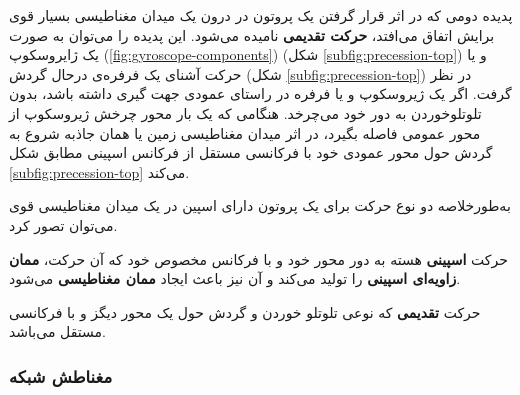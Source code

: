  
پدیده دومی که در اثر قرار گرفتن یک پروتون در درون یک میدان مغناطیسی بسیار قوی برایش اتفاق می‌افتد، \textbf{حرکت تقدیمی }نامیده می‌شود. این پدیده را می‌توان به صورت یک ژایروسکوپ 
(\ref{fig:gyroscope-components})
(شکل \ref{subfig:precession-top}) و یا حرکت آشنای یک فرفره‌ی درحال گردش (شکل \ref{subfig:precession-top})
در نظر گرفت. اگر یک ژیروسکوپ و یا فرفره در راستای عمودی جهت گیری داشته باشد، بدون تلوتلو‌خوردن
به دور خود می‌چرخد. هنگامی که یک بار محور چرخش ژیروسکوپ از محور عمومی فاصله بگیرد، در اثر میدان مغناطیسی زمین یا همان جاذبه
 شروع به گردش حول محور عمودی خود با فرکانسی مستقل از فرکانس اسپینی مطابق شکل \ref{subfig:precession-top}
می‌کند. 

به‌طور‌خلاصه دو نوع حرکت برای یک پروتون دارای اسپین در یک میدان مغناطیسی قوی می‌توان تصور کرد.

\begin{alphabetlist}
	\item
	حرکت \textbf{اسپینی} هسته به دور محور خود و با فرکانس مخصوص خود که آن حرکت، \textbf{ممان زاویه‌ای اسپینی }را تولید می‌کند و آن نیز باعث ایجاد \textbf{ممان مغناطیسی }می‌شود.
	\item
	حرکت \textbf{تقدیمی} که نوعی تلوتلو خوردن و  گردش حول یک محور دیگز و با فرکانسی مستقل می‌باشد.
\end{alphabetlist}


\subsubsection{مغناطش شبکه}


\begin{figure}
	\centering
	\caption{}
	\label{fig:net-mag}
\end{figure}


